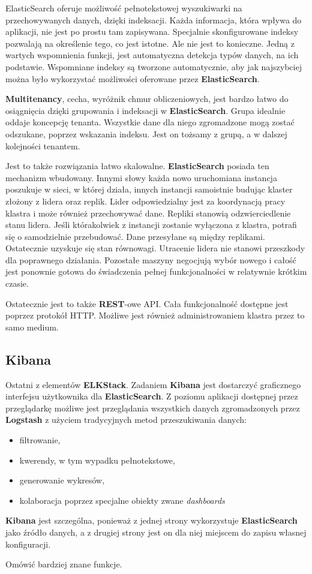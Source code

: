     ElasticSearch oferuje możliwość pełnotekstowej wyszukiwarki na przechowywanych danych, dzięki
    indeksacji. Każda informacja, która wpływa do aplikacji, nie jest po prostu tam zapisywana.
    Specjalnie skonfigurowane indeksy pozwalają na określenie tego, co jest istotne. Ale nie jest
    to konieczne. Jedną z wartych wspomnienia funkcji, jest automatyczna detekcja typów danych, na ich
    podstawie. Wspomniane indeksy są tworzone automatycznie, aby jak najszybciej można było
    wykorzystać możliwości oferowane przez \textbf{ElasticSearch}.
    
    \textbf{Multitenancy}, cecha, wyróżnik chmur obliczeniowych, jest bardzo łatwo do osiągnięcia
    dzięki grupowania i indeksacji w \textbf{ElasticSearch}. Grupa idealnie oddaje koncepcję tenanta.
    Wszystkie dane dla niego zgromadzone mogą zostać odszukane, poprzez wskazania indeksu. Jest on
    tożsamy z grupą, a w dalszej kolejności tenantem.
    
    Jest to także rozwiązania łatwo skalowalne. \textbf{ElasticSearch} posiada ten mechanizm wbudowany.
    Innymi słowy każda nowo uruchomiana instancja poszukuje w sieci, w której działa, innych instancji
    samoistnie budując klaster złożony z lidera oraz replik. 
    Lider odpowiedzialny jest za koordynacją pracy klastra i może również przechowywać dane.
    Repliki stanowią odzwierciedlenie stanu lidera. Jeśli którakolwiek z instancji zostanie wyłączona z klastra,
    potrafi się o samodzielnie przebudować. Dane przesyłane są między replikami. Ostatecznie uzyskuje się
    stan równowagi. Utracenie lidera nie stanowi przeszkody dla poprawnego działania. Pozostałe maszyny 
    negocjują wybór nowego i całość jest ponownie gotowa do świadczenia pełnej funkcjonalności w relatywnie
    krótkim czasie.

    Ostatecznie jest to także \textbf{REST}-owe API. Cała funkcjonalność dostępne jest poprzez
    protokół HTTP. Możliwe jest również administrowaniem klastra przez to samo medium.
    

\subsection{Kibana}
    Ostatni z elementów \textbf{ELKStack}. Zadaniem \textbf{Kibana} jest dostarczyć graficznego interfejsu
    użytkownika dla \textbf{ElasticSearch}. Z poziomu aplikacji dostępnej przez przeglądarkę możliwe
    jest przeglądania wszystkich danych zgromadzonych przez \textbf{Logstash} z użyciem tradycyjnych
    metod przeszukiwania danych:
    \begin{itemize}
        \item filtrowanie,
        \item kwerendy, w tym wypadku pełnotekstowe,
        \item generowanie wykresów,
        \item kolaboracja poprzez specjalne obiekty zwane \textit{dashboards}
    \end{itemize}
    
    \textbf{Kibana} jest szczególna, ponieważ z jednej strony wykorzystuje \textbf{ElasticSearch}
    jako źródło danych, a z drugiej strony jest on dla niej miejscem do zapisu własnej konfiguracji.
    
    \todo[inline] Omówić bardziej znane funkcje.